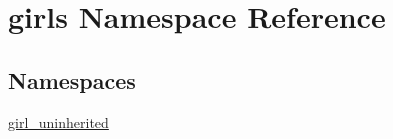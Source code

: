 \hypertarget{namespacegirls}{}\section{girls Namespace Reference}
\label{namespacegirls}
\subsection*{Namespaces}
\begin{DoxyCompactItemize}
\item 
 \hyperlink{namespacegirls_1_1girl__uninherited}{girl\+\_\+uninherited}
\end{DoxyCompactItemize}
